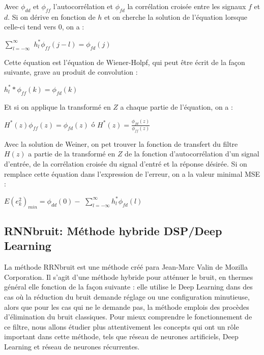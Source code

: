 \documentclass[conference,onecolumn]{IEEEtran}
\begin{document}
Avec $\phi_{dd}$ et $\phi_{ff}$ l’autocorrélation et $\phi_{fd}$ la corrélation croisée entre les signaux $f$ et $d$. Si on dérive en fonction de $h$ et on cherche la solution de l’équation lorsque celle-ci tend vers $0$, on a :

\begin{center}
     $\displaystyle\sum_{l= -\infty}^{\infty}$ $h_l^* \phi_{ff} (j-l)=\phi_{fd}(j)$
\end{center}

Cette équation est l’équation de Wiener-Holpf, qui peut être écrit de la façon suivante, grave au produit de convolution :

\begin{center}
     $h_l^* * \phi_{ff} (k) = \phi_{fd} (k)$
\end{center}
Et si on applique la transformé en $Z$ a chaque partie de l’équation, on a :

\begin{center}
     $H^*(z) \phi_{ff}(z)=\phi_{fd}(z)$  ó  $H^*(z)=\frac{\phi_{fd}(z)}{\phi_{ff}(z)}$
\end{center}

Avec la solution de Weiner, on pet trouver la fonction de transfert du filtre $H(z)$ a partie de la transformé en $Z$ de la fonction d’autocorrélation d’un signal d’entrée, de la corrélation croisée du signal d’entré et la réponse désirée. Si on remplace cette équation dans l’expression de l’erreur, on a la valeur minimal MSE :

\begin{center}
     $E(e_k^2)_{min}=\phi_{dd}(0)-$ $\displaystyle\sum_{l= -\infty}^{\infty}h_l^* \phi_{fd}(l)$
\end{center}


\subsection{\textbf{RNNbruit: Méthode hybride DSP/Deep Learning}}
La méthode RRNbruit est une méthode créé para Jean-Marc Valin de Mozilla Corporation. Il s’agit d’une méthode hybride pour atténuer le bruit, en thermes général elle fonction de la façon suivante : elle utilise le Deep Learning dans des cas où la réduction du bruit demande réglage ou une configuration minutieuse, alors que pour les cas qui ne le demande pas, la méthode emplois des procèdes d’élimination du bruit classiques. Pour mieux comprendre le fonctionnement de ce filtre, nous allons étudier plus attentivement les concepts qui ont un rôle important dans cette méthode, tels que réseau de neurones artificiels, Deep Learning et réseau de neurones récurrentes.
\hfill\\
\end{document}
